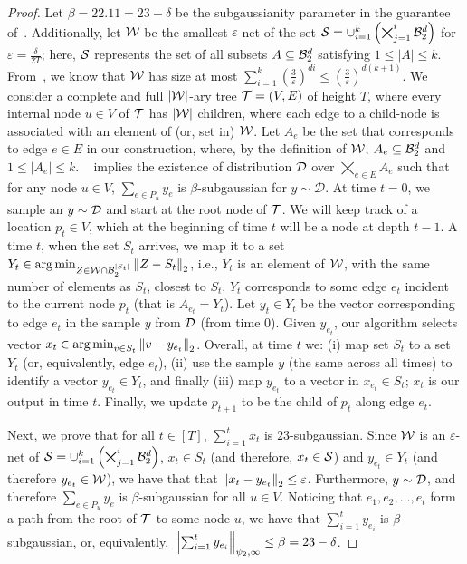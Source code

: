 \begin{proof}
    Let $\beta = 22.11 = 23-\delta$ be the subgaussianity parameter in the guarantee of~. Additionally, let $\mathcal{W}$ be the smallest $\varepsilon$-net of the set $\mathcal{S} = \cup_{i=1}^k \left( \bigtimes_{j=1}^i \mathcal{B}^d_2 \right)$ for $\varepsilon = \frac{\delta}{2T}$; here, $\mathcal{S}$ represents the set of all subsets $A \subseteq \mathcal{B}^d_2$ satisfying $1 \leq |A| \leq k$. From~, we know that $\mathcal{W}$ has size at most $\sum_{i=1}^k \left(\frac{3}{\varepsilon}\right)^{di} \leq \left(\frac{3}{\varepsilon}\right)^{d(k+1)}$. We consider a complete and full $|\mathcal{W}|$-ary tree $\mathcal{T} = (V,E)$ of height $T$, where every internal node $u \in V$ of $\mathcal{T}$ has $|\mathcal{W}|$ children, where each edge to a child-node is associated with an element of (or, set in) $\mathcal{W}$. Let $A_e$ be the set that corresponds to edge $e \in E$ in our construction, where, by the definition of $\mathcal{W}$, $A_e \subseteq \mathcal{B}^d_2$ and $1 \leq |A_e| \leq k$. ~ implies the existence of distribution $\mathcal{D}$ over $\bigtimes_{e \in E} A_e$  such that for any node $u \in V$, $\sum_{e \in P_u} y_e$ is $\beta$-subgaussian for $y \sim \mathcal{D}$.
    At time $t=0$, we sample an $y \sim \mathcal{D}$ and start at the root node of $\mathcal{T}$. We will keep track of a location $p_t \in V$, which at the beginning of time $t$ will be a node at depth $t-1$. A time $t$, when the set $S_t$ arrives, we map it to a set $Y_t \in \operatorname*{arg\,min}_{Z \in \mathcal{W} \cap \mathcal{B}_2^{|S_t|}} \left\lVert Z - S_t\right\rVert_2$, i.e., $Y_t$ is an element of $\mathcal{W}$, with the same number of elements as $S_t$, closest to $S_t$. $Y_t$ corresponds to some edge $e_t$ incident to the current node $p_t$ (that is $A_{e_{t}} = Y_t$). Let $y_{t} \in Y_t$ be the vector corresponding to edge $e_t$ in the sample $y$ from $\mathcal{D}$ (from time $0$). Given $y_{e_t}$, our algorithm selects vector $x_{t} \in \operatorname*{arg\,min}_{v \in S_t}\left\lVert v - y_{e_t}\right\rVert_2$. Overall, at time $t$ we: (i) map set $S_t$ to a set $Y_t$ (or, equivalently, edge $e_t$), (ii) use the sample $y$ (the same across all times) to identify a vector $y_{e_t} \in Y_t$, and finally (iii) map $y_{e_t}$ to a vector in $x_{e_t} \in S_t$; $x_{t}$ is our output in time $t$.
    Finally, we update $p_{t+1}$ to be the child of $p_t$ along edge $e_t$.

    Next, we prove that for all $t \in [T]$, $\sum_{i=1}^t x_t$ is $23$-subgaussian. Since $\mathcal{W}$ is an $\varepsilon$-net of $\mathcal{S} = \cup_{i=1}^k \left( \bigtimes_{j=1}^i \mathcal{B}^d_2 \right)$, $x_t \in S_t$ (and therefore, $x_t \in \mathcal{S}$) and $y_{e_t} \in Y_t$ (and therefore $y_{e_t} \in \mathcal{W}$), we have that that $\left\lVert x_t - y_{e_t}\right\rVert_2 \leq \varepsilon$. Furthermore, $y \sim \mathcal{D}$, and therefore $\sum_{e \in P_u} y_e$ is $\beta$-subgaussian for all $u \in V$. Noticing that $e_{1}, e_{2}, \dots, e_t$ form a path from the root of $\mathcal{T}$ to some node $u$, we have that $\sum_{i=1}^t y_{e_i}$ is $\beta$-subgaussian, or, equivalently, $\left\lVert\sum_{i=1}^t y_{e_i}\right\rVert_{\psi_2, \infty} \leq \beta = 23 - \delta$.
    

\end{proof}
